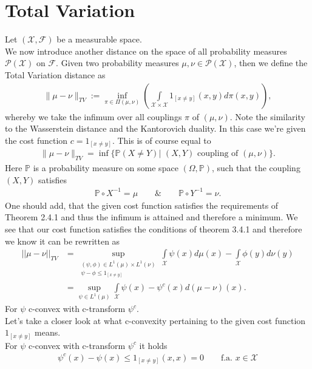 \documentclass[11pt,a4paper]{article}
\begin{document}
\section{Total Variation}
Let $(\mathcal{X,F})$ be a measurable space.\vspace{1em}\\
We now introduce another distance on the space of all probability measures $\mathcal{P(X)}$ on $\mathcal{F}$. Given two probability measures $\mu,\nu\in\mathcal{P(X)}$, then we define the Total Variation distance as
\begin{align*}
\|\mu-\nu\|_{TV}:=\inf\limits_{\pi\in\Pi(\mu,\nu)}\left(\int\limits_{\mathcal{X\times{}X}}1_{[x\neq{}y]}(x,y)d\pi(x,y)\right), 
\end{align*}
whereby we take the infimum over all couplings $\pi$ of $(\mu,\nu)$. Note the similarity to the Wasserstein distance and the Kantorovich duality. In this case we're given the cost function $c=1_{[x\neq{}y]}$. This is of course equal to
\begin{align*}
\|\mu-\nu\|_{TV} = \inf\bigg\lbrace\mathbb{P}\left(X\neq{}Y\right)\Big|\,\,(X,Y)\text{ coupling of }(\mu,\nu)\bigg\rbrace.
\end{align*}
Here $\mathbb{P}$ is a probability measure on some space $(\Omega,\mathbb{P})$, such that the coupling $(X,Y)$ satisfies
\begin{align*}
\mathbb{P}\circ{}X^{-1} = \mu\quad\quad\&\quad\quad\mathbb{P}\circ{}Y^{-1} = \nu.
\end{align*}
One should add, that the given cost function satisfies the requirements of Theorem 2.4.1 and thus the infimum is attained and therefore a minimum.
We see that our cost function satisfies the conditions of theorem 3.4.1 and therefore we know it can be rewritten as
\begin{align*}
||\mu-\nu||_{TV} &= \sup\limits_{\substack{(\psi,\phi)\in{}L^1(\mu)\times{}L^1(\nu)\\\psi-\phi\leq{}1_{[x\neq{}y]}}}\int\limits_{\mathcal{X}}\psi(x)d\mu(x)-\int\limits_{\mathcal{X}}\phi(y)d\nu(y)\\[15pt]& = \sup\limits_{\psi\in{}L^1(\mu)}\int\limits_{\mathcal{X}}\psi(x)-\psi^c(x)d(\mu-\nu)(x).
\end{align*}
For $\psi$ c-convex with c-transform $\psi^c$. \\
Let's take a closer look at what c-convexity pertaining to the given cost function $1_{[x\neq{}y]}$ means.\\
For $\psi$ c-convex with c-transform $\psi^c$ it holds
\begin{align*}
\psi^c(x)-\psi(x)\leq{}1_{[x\neq{}y]}(x,x)=0 \qquad \text{f.a. }x\in\mathcal{X}
\end{align*}
\end{document}
